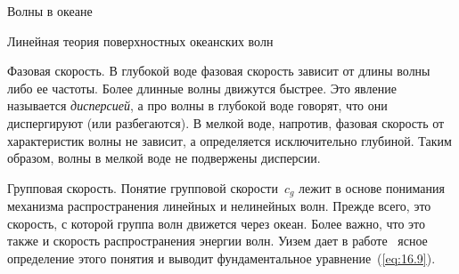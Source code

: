 \begin{chapter}{Волны в океане}
\begin{section}{Линейная теория поверхностных океанских волн}
\begin{paragraph}{Фазовая скорость.}
В глубокой воде фазовая скорость зависит от длины волны либо ее частоты. 
Более длинные волны движутся быстрее. Это явление называется \emph{дисперсией},
а про волны в глубокой воде говорят, что они диспергируют (или разбегаются). 
В мелкой воде, напротив, фазовая скорость от характеристик волны не зависит,
а определяется исключительно глубиной. Таким образом, волны в мелкой
воде не подвержены дисперсии.
%
\end{paragraph}

\begin{paragraph}{Групповая скорость.}
Понятие групповой
скорости~$c_{g}$ лежит в основе понимания механизма распространения 
линейных и нелинейных волн. Прежде всего, это скорость, с которой группа волн
движется через океан. Более важно, что это также и скорость распространения
энергии волн.
Уизем дает в работе~\cite[\S~1.3 и~\S~11.6]{Whitham:1974} ясное определение этого
понятия и выводит фундаментальное уравнение~(\ref{eq:16.9}).
%


\end{paragraph}
\end{section}
\end{chapter}
